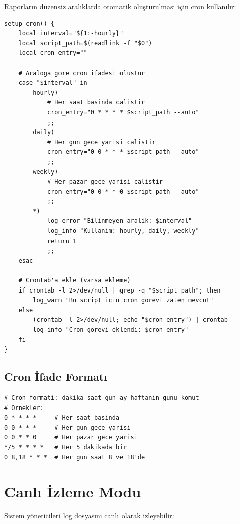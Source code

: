 \documentclass[12pt,a4paper]{report}
\begin{document}
Raporların düzensiz aralıklarda otomatik oluşturulması için cron kullanılır:

\begin{lstlisting}[style=bashstyle,caption={Cron Kurulumu}]
setup_cron() {
    local interval="${1:-hourly}"
    local script_path=$(readlink -f "$0")
    local cron_entry=""
    
    # Araloga gore cron ifadesi olustur
    case "$interval" in
        hourly)
            # Her saat basinda calistir
            cron_entry="0 * * * * $script_path --auto"
            ;;
        daily)
            # Her gun gece yarisi calistir
            cron_entry="0 0 * * * $script_path --auto"
            ;;
        weekly)
            # Her pazar gece yarisi calistir
            cron_entry="0 0 * * 0 $script_path --auto"
            ;;
        *)
            log_error "Bilinmeyen aralik: $interval"
            log_info "Kullanim: hourly, daily, weekly"
            return 1
            ;;
    esac
    
    # Crontab'a ekle (varsa ekleme)
    if crontab -l 2>/dev/null | grep -q "$script_path"; then
        log_warn "Bu script icin cron gorevi zaten mevcut"
    else
        (crontab -l 2>/dev/null; echo "$cron_entry") | crontab -
        log_info "Cron gorevi eklendi: $cron_entry"
    fi
}
\end{lstlisting}

\subsection{Cron İfade Formatı}

\begin{lstlisting}[style=bashstyle]
# Cron formati: dakika saat gun ay haftanin_gunu komut
# Ornekler:
0 * * * *     # Her saat basinda
0 0 * * *     # Her gun gece yarisi
0 0 * * 0     # Her pazar gece yarisi
*/5 * * * *   # Her 5 dakikada bir
0 8,18 * * *  # Her gun saat 8 ve 18'de
\end{lstlisting}

\section{Canlı İzleme Modu}

Sistem yöneticileri log dosyasını canlı olarak izleyebilir:
\end{document}
